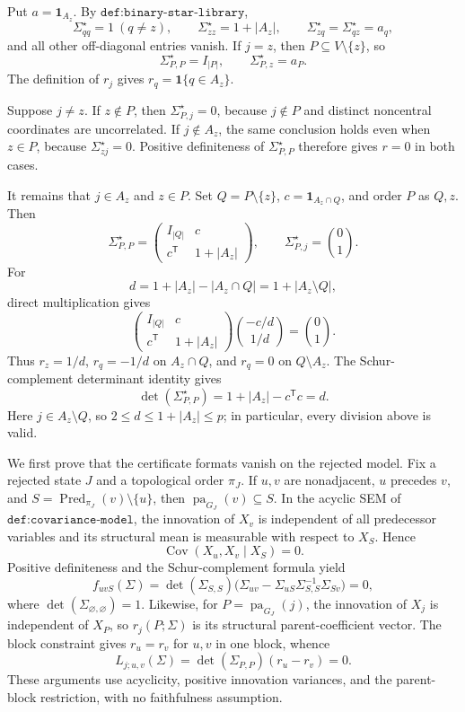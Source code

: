 Put \(a=\mathbf 1_{A_z}\).  By \(\texttt{def:binary-star-library}\),
\[
 \Sigma^{\star}_{qq}=1\ (q\ne z),\qquad
 \Sigma^{\star}_{zz}=1+|A_z|,\qquad
 \Sigma^{\star}_{zq}=\Sigma^{\star}_{qz}=a_q,
\]
and all other off-diagonal entries vanish.  If \(j=z\), then \(P\subseteq V\setminus\{z\}\), so
\[
 \Sigma^{\star}_{P,P}=I_{|P|},\qquad \Sigma^{\star}_{P,z}=a_P.
\]
The definition of \(r_j\) gives \(r_q=\mathbf 1\{q\in A_z\}\).

Suppose \(j\ne z\).  If \(z\notin P\), then \(\Sigma^{\star}_{P,j}=0\), because \(j\notin P\) and distinct noncentral coordinates are uncorrelated.  If \(j\notin A_z\), the same conclusion holds even when \(z\in P\), because \(\Sigma^{\star}_{zj}=0\).  Positive definiteness of \(\Sigma^{\star}_{P,P}\) therefore gives \(r=0\) in both cases.

It remains that \(j\in A_z\) and \(z\in P\).  Set \(Q=P\setminus\{z\}\), \(c=\mathbf 1_{A_z\cap Q}\), and order \(P\) as \(Q,z\).  Then
\[
 \Sigma^{\star}_{P,P}=
 \begin{pmatrix}I_{|Q|}&c\\ c^{\mathsf T}&1+|A_z|\end{pmatrix},
 \qquad
 \Sigma^{\star}_{P,j}=\binom{0}{1}.
\]
For
\[
 d=1+|A_z|-|A_z\cap Q|=1+|A_z\setminus Q|,
\]
direct multiplication gives
\[
 \begin{pmatrix}I_{|Q|}&c\\ c^{\mathsf T}&1+|A_z|\end{pmatrix}
 \binom{-c/d}{1/d}=\binom{0}{1}.
\]
Thus \(r_z=1/d\), \(r_q=-1/d\) on \(A_z\cap Q\), and \(r_q=0\) on \(Q\setminus A_z\).  The Schur-complement determinant identity gives
\[
 \det(\Sigma^{\star}_{P,P})=1+|A_z|-c^{\mathsf T}c=d.
\]
Here \(j\in A_z\setminus Q\), so \(2\le d\le1+|A_z|\le p\); in particular, every division above is valid.

We first prove that the certificate formats vanish on the rejected model.  Fix a rejected state \(J\) and a topological order \(\pi_J\).  If \(u,v\) are nonadjacent, \(u\) precedes \(v\), and \(S=\operatorname{Pred}_{\pi_J}(v)\setminus\{u\}\), then \(\operatorname{pa}_{G_J}(v)\subseteq S\).  In the acyclic SEM of \(\texttt{def:covariance-model}\), the innovation of \(X_v\) is independent of all predecessor variables and its structural mean is measurable with respect to \(X_S\).  Hence
\[
 \operatorname{Cov}(X_u,X_v\mid X_S)=0.
\]
Positive definiteness and the Schur-complement formula yield
\[
 f_{uvS}(\Sigma)=\det(\Sigma_{S,S})
 \bigl(\Sigma_{uv}-\Sigma_{uS}\Sigma_{S,S}^{-1}\Sigma_{Sv}\bigr)=0,
\]
where \(\det(\Sigma_{\varnothing,\varnothing})=1\).  Likewise, for \(P=\operatorname{pa}_{G_J}(j)\), the innovation of \(X_j\) is independent of \(X_P\), so \(r_j(P;\Sigma)\) is its structural parent-coefficient vector.  The block constraint gives \(r_u=r_v\) for \(u,v\) in one block, whence
\[
 L_{j;u,v}(\Sigma)=\det(\Sigma_{P,P})(r_u-r_v)=0.
\]
These arguments use acyclicity, positive innovation variances, and the parent-block restriction, with no faithfulness assumption.

